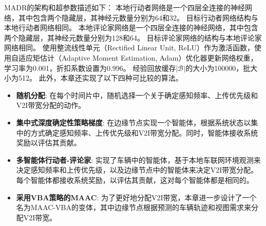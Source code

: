 MADR的架构和超参数描述如下：
本地行动者网络是一个四层全连接的神经网络，其中包含两个隐藏层，其神经元数量分别为64和32。
目标行动者网络结构与本地行动者网络相同。
本地评论家网络是一个四层全连接的神经网络，其中包含两个隐藏层，其神经元数量分别为128和64。
目标评论家网络的结构与本地评论家网络相同。
使用整流线性单元（Rectified Linear Unit, ReLU）作为激活函数，使用自适应矩估计（Adaptive Moment Estimation, Adam）优化器更新网络权重，学习率为0.001，折扣系数设置为0.996。
经验回放缓存$|\mathcal{B}|$的大小为100000，批大小为512。
此外，本章还实现了以下四种可比较的算法。

\begin{itemize}
	\item \textbf{随机分配}: 在每个时间片中，随机选择一个关于确定感知频率、上传优先级和V2I带宽分配的动作。
	\item \textbf{集中式深度确定性策略梯度}\cite{mlika2022deep}: 在边缘节点实现一个智能体，根据系统状态以集中的方式确定感知频率、上传优先级和V2I带宽分配。同时，智能体接收系统奖励以评估其贡献。
	\item \textbf{多智能体行动者-评论家}\cite{he2021efficient}: 实现了车辆中的智能体，基于本地车联网环境观测来决定感知频率和上传优先级，以及边缘节点中的智能体来决定V2I带宽分配。每个智能体都接收系统奖励，以评估其贡献，这对每个智能体都是相同的。
	\item \textbf{采用VBA策略的MAAC}: 为了更好地分配V2I带宽，本章进一步设计了一个名为MAAC-VBA的变体，其中边缘节点根据预测的车辆轨迹和视图需求来分配V2I带宽。
\end{itemize}

